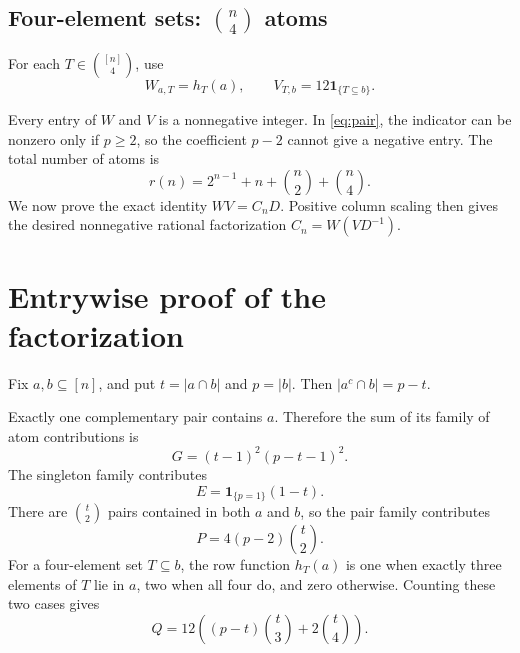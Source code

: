 \documentclass[11pt]{article}
\newcommand{\ind}[1]{\mathbf 1_{\{#1\}}}
\begin{document}
\subsection*{Four-element sets: $\binom n4$ atoms}
For each $T\in\binom{[n]}4$, use
\begin{equation}\label{eq:four}
W_{a,T}=h_T(a),\qquad V_{T,b}=12\ind{T\subseteq b}.
\end{equation}

Every entry of $W$ and $V$ is a nonnegative integer. In \eqref{eq:pair}, the indicator can be nonzero only if $p\ge2$, so the coefficient $p-2$ cannot give a negative entry. The total number of atoms is
\begin{equation}\label{eq:r}
r(n)=2^{n-1}+n+\binom n2+\binom n4.
\end{equation}
We now prove the exact identity $WV=C_nD$. Positive column scaling then gives the desired nonnegative rational factorization $C_n=W(VD^{-1})$.

\newpage
\section{Entrywise proof of the factorization}\label{sec:proof}

Fix $a,b\subseteq[n]$, and put $t=|a\cap b|$ and $p=|b|$. Then $|a^c\cap b|=p-t$.

Exactly one complementary pair contains $a$. Therefore the sum of its family of atom contributions is
\begin{equation}\label{eq:G}
G=(t-1)^2(p-t-1)^2.
\end{equation}
The singleton family contributes
\begin{equation}\label{eq:E}
E=\ind{p=1}(1-t).
\end{equation}
There are $\binom t2$ pairs contained in both $a$ and $b$, so the pair family contributes
\begin{equation}\label{eq:P}
P=4(p-2)\binom t2.
\end{equation}
For a four-element set $T\subseteq b$, the row function $h_T(a)$ is one when exactly three elements of $T$ lie in $a$, two when all four do, and zero otherwise. Counting these two cases gives
\begin{equation}\label{eq:Q}
Q=12\left((p-t)\binom t3+2\binom t4\right).
\end{equation}
\end{document}
